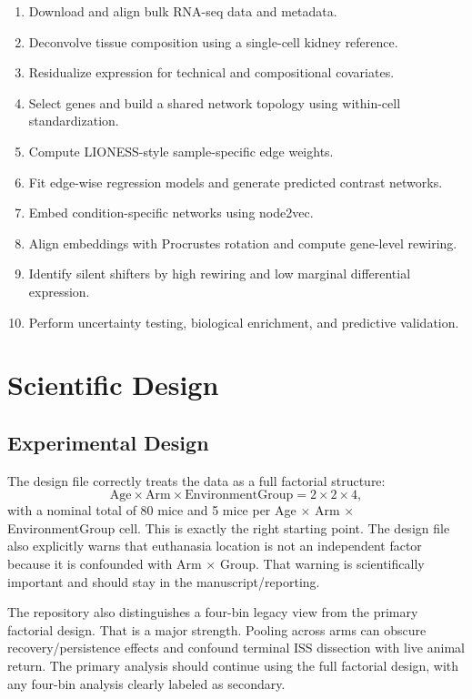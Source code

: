 \documentclass[11pt]{article}
\begin{document}
\begin{enumerate}[leftmargin=1.5em]
    \item Download and align bulk RNA-seq data and metadata.
    \item Deconvolve tissue composition using a single-cell kidney reference.
    \item Residualize expression for technical and compositional covariates.
    \item Select genes and build a shared network topology using within-cell standardization.
    \item Compute LIONESS-style sample-specific edge weights.
    \item Fit edge-wise regression models and generate predicted contrast networks.
    \item Embed condition-specific networks using node2vec.
    \item Align embeddings with Procrustes rotation and compute gene-level rewiring.
    \item Identify silent shifters by high rewiring and low marginal differential expression.
    \item Perform uncertainty testing, biological enrichment, and predictive validation.
\end{enumerate}

\section{Scientific Design}

\subsection{Experimental Design}

The design file correctly treats the data as a full factorial structure:
\[
\text{Age} \times \text{Arm} \times \text{EnvironmentGroup}
= 2 \times 2 \times 4,
\]
with a nominal total of 80 mice and 5 mice per Age $\times$ Arm $\times$ EnvironmentGroup cell.  This is exactly the right starting point.  The design file also explicitly warns that euthanasia location is not an independent factor because it is confounded with Arm $\times$ Group.  That warning is scientifically important and should stay in the manuscript/reporting.

The repository also distinguishes a four-bin legacy view from the primary factorial design.  That is a major strength.  Pooling across arms can obscure recovery/persistence effects and confound terminal ISS dissection with live animal return.  The primary analysis should continue using the full factorial design, with any four-bin analysis clearly labeled as secondary.
\end{document}
